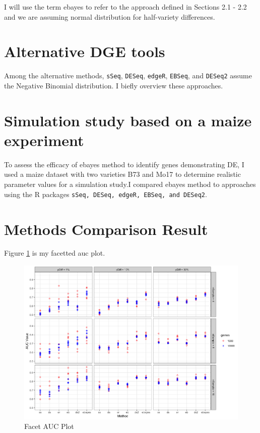\documentclass[11pt]{isuthesis}
\begin{document}
I will use the term ebayes to refer to the approach defined in Sections 2.1 - 2.2 and we are assuming normal distribution for half-variety differences.

\section{Alternative DGE tools}

Among the alternative methods, {\tt sSeq}\citep{10.1093/bioinformatics/btt143}, {\tt DESeq}\citep{anders2010differential}, {\tt edgeR}\citep{robinson2007moderated}\citep{robinson2010edger}, {\tt EBSeq}\citep{leng2013ebseq}, and {\tt DESeq2}\citep{love2014moderated} assume the Negative Binomial distribution. I biefly overview these approaches. 



\section{Simulation study based on a maize experiment}

To assess the efficacy of ebayes method to identify genes demonstrating DE, I used a maize dataset with two varieties B73 and Mo17\citep{paschold2012complementation} to determine realistic parameter values for a simulation study.I compared ebayes method to approaches using the R packages {\tt sSeq, DESeq, edgeR, EBSeq, and DESeq2}.



\section{Methods Comparison Result}

Figure \ref{auc} is my facetted auc plot.

\begin{figure}[h!tb] 
\includegraphics[scale=0.4]{auc_facet_plot}
\caption{Facet AUC Plot}
\label{auc}
\end{figure}



%
%


\renewcommand{\bibname}{\centerline{BIBLIOGRAPHY}}
\unappendixtitle
\newpage
{}


\end{document}
